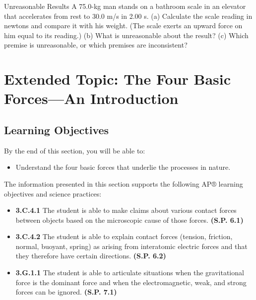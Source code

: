 \documentclass[
]{book}
\providecommand{\tightlist}{%
  \setlength{\itemsep}{0pt}\setlength{\parskip}{0pt}}
\newenvironment{learning-objectives}{}{}
\newenvironment{problems-exercises}{}{}
\newenvironment{tinysection}{}{}
\begin{document}
\begin{problems-exercises}
\begin{tinysection}
\end{tinysection}

\hypertarget{fs-id1890360}{}
\hypertarget{fs-id1890362}{}
\begin{tinysection}

{Unreasonable Results} A 75.0-kg man stands on a
bathroom scale in an elevator that accelerates from rest to 30.0 m/s in
2.00 s. (a) Calculate the scale reading in newtons and compare it with
his weight. (The scale exerts an upward force on him equal to its
reading.) (b) What is unreasonable about the result? (c) Which premise
is unreasonable, or which premises are inconsistent?

\end{tinysection}

\end{problems-exercises}

\hypertarget{extended-topic-the-four-basic-forcesan-introduction}{%
\section{Extended Topic: The Four Basic Forces---An Introduction}\label{extended-topic-the-four-basic-forcesan-introduction}}

\hypertarget{fs-id1910513}{}
\begin{learning-objectives}

\hypertarget{learning-objectives-19}{%
\subsection{Learning Objectives}\label{learning-objectives-19}}

By the end of this section, you will be able to:

\begin{itemize}
\tightlist
\item
  Understand the four basic forces that underlie the processes in
  nature.
\end{itemize}

The information presented in this section supports the following AP®
learning objectives and science practices:

\begin{itemize}
\tightlist
\item
  \textbf{3.C.4.1} The student is able to make claims about various contact
  forces between objects based on the microscopic cause of those
  forces. \textbf{(S.P. 6.1)}
\item
  \textbf{3.C.4.2} The student is able to explain contact forces (tension,
  friction, normal, buoyant, spring) as arising from interatomic
  electric forces and that they therefore have certain directions.
  \textbf{(S.P. 6.2)}
\item
  \textbf{3.G.1.1} The student is able to articulate situations when the
  gravitational force is the dominant force and when the
  electromagnetic, weak, and strong forces can be ignored. \textbf{(S.P.
  7.1)}
\end{itemize}

\end{learning-objectives}
\end{document}
